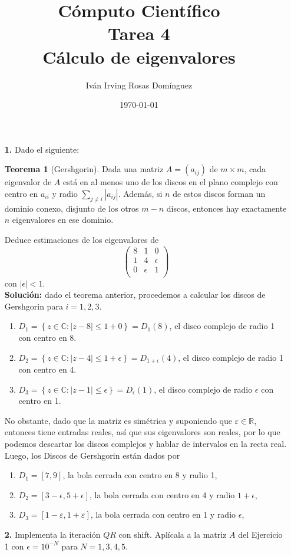 \documentclass[letterpaper]{article}
\title{\textbf{Cómputo Científico\\Tarea 4\\Cálculo de eigenvalores}}
\author{Iván Irving Rosas Domínguez}
\date{\today}
\newcommand{\R}{\mathbb{R}}
\newcommand{\C}{\mathbb{C}}
\newcommand{\1}{\mathds{1}}
\theoremstyle{definition}
\theoremstyle{definition}
\newtheorem{teo}{Teorema}
\theoremstyle{definition}
\theoremstyle{definition}
\theoremstyle{definition}
\begin{document}
\maketitle


\begin{enumerate}
    \item[\textbf{1.}] Dado el siguiente:
    \begin{teo}[Gershgorin]
        Dada una matriz $A=(a_{ij})$ de $m\times m$, cada eigenvalor de $A$ está en al menos
        uno de los discos en el plano complejo con centro en $a_{ii}$ y radio $\sum_{j\neq i}|a_{ij}|$. 
        Además, si $n$ de estos discos forman un dominio conexo, disjunto de los otros $m-n$ discos, 
        entonces hay exactamente $n$ eigenvalores en ese dominio.
    \end{teo}
    Deduce estimaciones de los eigenvalores de 
\[
    \begin{pmatrix}
    8 & 1 & 0\\
    1 & 4 & \epsilon\\
    0 & \epsilon & 1\\    
    \end{pmatrix}
    \]
    con $|\epsilon|<1$.\\

    \textbf{Solución:} dado el teorema anterior, procedemos a calcular los discos de Gershgorin para $i=1,2,3$.
    \begin{enumerate}
        \item $D_{1}=\left\{z\in \C : |z-8|\leq 1+0\right\}=D_{1}(8)$, el disco complejo de radio 1 con 
        centro en 8.
        \item $D_{2}=\left\{z\in\C : |z-4|\leq 1+\epsilon\right\}=D_{1+\epsilon}(4)$, el disco complejo de 
        radio 1 con centro en 4.
        \item $D_{3}=\left\{z\in \C : |z-1|\leq \epsilon\right\}=D_{\epsilon}(1)$, el disco complejo de radio
        $\epsilon$ con centro en 1.
    \end{enumerate}
    No obstante, dado que la matriz es simétrica y suponiendo que $\varepsilon\in \R$, entonces tiene entradas reales, así que sus eigenvalores son reales, por lo que
    podemos descartar los discos complejos y hablar de intervalos en la recta real. Luego, los Discos de Gershgorin están dados por 
    \begin{enumerate}
        \item $D_{1}=[7,9]$, la bola cerrada con centro en 8 y radio 1,
        \item $D_{2}=[3-\epsilon,5+\epsilon]$, la bola cerrada con centro en 4 y radio $1+\epsilon$,
        \item $D_{3}=[1-\varepsilon,1+\varepsilon]$, la bola cerrada con centro en 1 y radio $\epsilon$,
    \end{enumerate}
    \item[\textbf{2.}] Implementa la iteración $QR$ con shift. Aplícala a la matriz $A$ del Ejercicio 1 con 
    $\epsilon=10^{-N}$ para $N=1,3,4,5$.\\


\end{enumerate}
\end{document}
